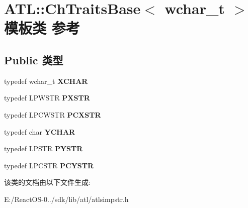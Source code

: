 \hypertarget{class_a_t_l_1_1_ch_traits_base_3_01wchar__t_01_4}{}\section{A\+TL\+:\+:Ch\+Traits\+Base$<$ wchar\+\_\+t $>$ 模板类 参考}
\label{class_a_t_l_1_1_ch_traits_base_3_01wchar__t_01_4}
\subsection*{Public 类型}
\begin{DoxyCompactItemize}
\item 
\mbox{\label{class_a_t_l_1_1_ch_traits_base_3_01wchar__t_01_4_a950113472fa6890ca5ec7a3db4ea8717}} 
typedef wchar\+\_\+t {\bfseries X\+C\+H\+AR}
\item 
\mbox{\label{class_a_t_l_1_1_ch_traits_base_3_01wchar__t_01_4_a02556c5b8dd360274509e2fb679cc051}} 
typedef L\+P\+W\+S\+TR {\bfseries P\+X\+S\+TR}
\item 
\mbox{\label{class_a_t_l_1_1_ch_traits_base_3_01wchar__t_01_4_af448edce7f45fb9a6711b8060c7b627a}} 
typedef L\+P\+C\+W\+S\+TR {\bfseries P\+C\+X\+S\+TR}
\item 
\mbox{\label{class_a_t_l_1_1_ch_traits_base_3_01wchar__t_01_4_ab7a1f1d15268d60481317b657cd8f7e7}} 
typedef char {\bfseries Y\+C\+H\+AR}
\item 
\mbox{\label{class_a_t_l_1_1_ch_traits_base_3_01wchar__t_01_4_a4fcf8b93b1bc19646713ef9139d24452}} 
typedef L\+P\+S\+TR {\bfseries P\+Y\+S\+TR}
\item 
\mbox{\label{class_a_t_l_1_1_ch_traits_base_3_01wchar__t_01_4_a6d1d2d0901fc342ba20562c604be4c2f}} 
typedef L\+P\+C\+S\+TR {\bfseries P\+C\+Y\+S\+TR}
\end{DoxyCompactItemize}


该类的文档由以下文件生成\+:\begin{DoxyCompactItemize}
\item 
E\+:/\+React\+O\+S-\/0../sdk/lib/atl/atlsimpstr.\+h\end{DoxyCompactItemize}
